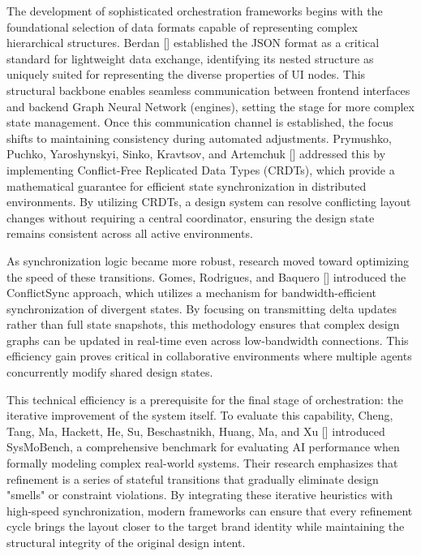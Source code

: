 \begin{refsection}
The development of sophisticated orchestration frameworks begins with the foundational selection of data formats capable of representing complex hierarchical structures. Berdan [\citeyear{Berdan2025Formats}] established the JSON format as a critical standard for lightweight data exchange, identifying its nested structure as uniquely suited for representing the diverse properties of UI nodes. This structural backbone enables seamless communication between frontend interfaces and backend Graph Neural Network (engines), setting the stage for more complex state management. Once this communication channel is established, the focus shifts to maintaining consistency during automated adjustments. Prymushko, Puchko, Yaroshynskyi, Sinko, Kravtsov, and Artemchuk [\citeyear{Prymushko2025CRDT}] addressed this by implementing Conflict-Free Replicated Data Types (CRDTs), which provide a mathematical guarantee for efficient state synchronization in distributed environments. By utilizing CRDTs, a design system can resolve conflicting layout changes without requiring a central coordinator, ensuring the design state remains consistent across all active environments.
 
As synchronization logic became more robust, research moved toward optimizing the speed of these transitions. Gomes, Rodrigues, and Baquero [\citeyear{Gomes2025ConflictSync}] introduced the ConflictSync approach, which utilizes a mechanism for bandwidth-efficient synchronization of divergent states. By focusing on transmitting delta updates rather than full state snapshots, this methodology ensures that complex design graphs can be updated in real-time even across low-bandwidth connections. This efficiency gain proves critical in collaborative environments where multiple agents concurrently modify shared design states.

This technical efficiency is a prerequisite for the final stage of orchestration: the iterative improvement of the system itself. To evaluate this capability, Cheng, Tang, Ma, Hackett, He, Su, Beschastnikh, Huang, Ma, and Xu [\citeyear{Cheng2025SysMoBench}] introduced SysMoBench, a comprehensive benchmark for evaluating AI performance when formally modeling complex real-world systems. Their research emphasizes that refinement is a series of stateful transitions that gradually eliminate design "smells" or constraint violations. By integrating these iterative heuristics with high-speed synchronization, modern frameworks can ensure that every refinement cycle brings the layout closer to the target brand identity while maintaining the structural integrity of the original design intent.


\end{refsection}
